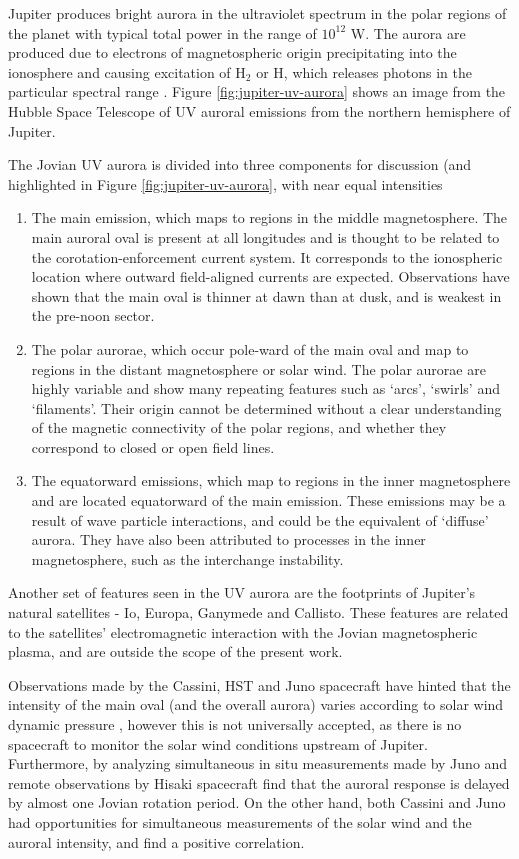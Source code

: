 Jupiter produces bright aurora in the ultraviolet spectrum in the polar regions of the planet with typical total power in the range of $10^{12}$ W. The aurora are produced due to electrons of magnetospheric origin precipitating into the ionosphere and causing excitation of H$_2$ or H, which releases photons in the particular spectral range \cite{Grodent2015}. Figure \ref{fig:jupiter-uv-aurora} shows an image from the Hubble Space Telescope of UV auroral emissions from the northern hemisphere of Jupiter.

The Jovian UV aurora is divided into three components for discussion (and highlighted in Figure 
\ref{fig:jupiter-uv-aurora}, with near equal intensities

\begin{enumerate}
    \item The main emission, which maps to regions in the middle magnetosphere. The main auroral oval is present at all longitudes and is thought to be related to the corotation-enforcement current system. It corresponds to the ionospheric location where outward field-aligned currents are expected. Observations have shown that the main oval is thinner at dawn than at dusk, and is weakest in the pre-noon sector. 
    \item The polar aurorae, which occur pole-ward of the main oval and map to regions in the distant magnetosphere or solar wind. The polar aurorae are highly variable and show many repeating features such as `arcs', `swirls' and `filaments'. Their origin cannot be determined without a clear understanding of the magnetic connectivity of the polar regions, and whether they correspond to closed or open field lines.
    \item The equatorward emissions, which map to regions in the inner magnetosphere and are located equatorward of the main emission. These emissions may be a result of wave particle interactions, and could be the equivalent of `diffuse' aurora. They have also been attributed to processes in the inner magnetosphere, such as the interchange instability.
\end{enumerate}

Another set of features seen in the UV aurora are the footprints of Jupiter's natural satellites - Io, Europa, Ganymede and Callisto. These features are related to the satellites' electromagnetic interaction with the Jovian magnetospheric plasma, and are outside the scope of the present work. 

Observations made by the Cassini, HST and Juno spacecraft have hinted that the intensity of the main oval (and the overall aurora) varies according to solar wind dynamic pressure \cite{Nichols2007a,Nichols2017a}, however this is not universally accepted, as there is no spacecraft to monitor the solar wind conditions upstream of Jupiter. Furthermore, by analyzing simultaneous in situ measurements made by Juno and remote observations by Hisaki spacecraft \cite{Kita2016} find that the auroral response is delayed by almost one Jovian rotation period. On the other hand, both Cassini and Juno had opportunities for simultaneous measurements of the solar wind and the auroral intensity, and find a positive correlation. 


